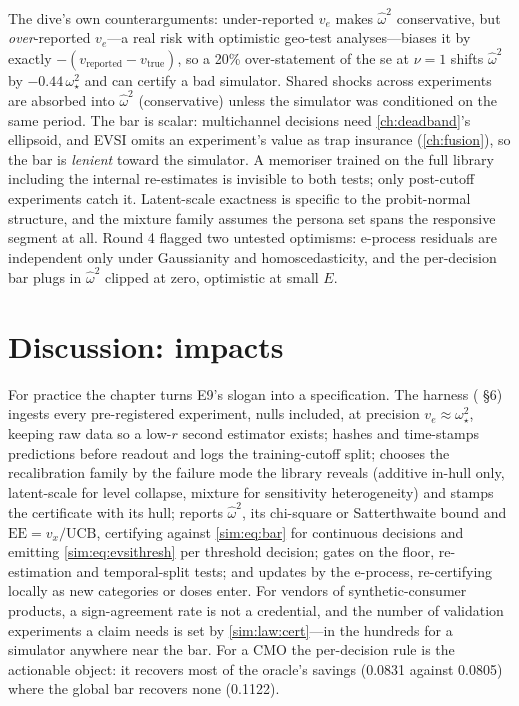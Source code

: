The dive's own counterarguments: under-reported $v_e$ makes $\hat\omega^2$ conservative, but \emph{over}-reported $v_e$---a real risk with optimistic geo-test analyses---biases it by exactly $-(v_{\mathrm{reported}} - v_{\mathrm{true}})$, so a 20\% over-statement of the se at $\nu = 1$ shifts $\hat\omega^2$ by $-0.44\,\omega_\star^2$ and can certify a bad simulator. Shared shocks across experiments are absorbed into $\hat\omega^2$ (conservative) unless the simulator was conditioned on the same period. The bar is scalar: multichannel decisions need \cref{ch:deadband}'s ellipsoid, and EVSI omits an experiment's value as trap insurance (\cref{ch:fusion}), so the bar is \emph{lenient} toward the simulator. A memoriser trained on the full library including the internal re-estimates is invisible to both tests; only post-cutoff experiments catch it. Latent-scale exactness is specific to the probit-normal structure, and the mixture family assumes the persona set spans the responsive segment at all. Round 4 flagged two untested optimisms: e-process residuals are independent only under Gaussianity and homoscedasticity, and the per-decision bar plugs in $\hat\omega^2$ clipped at zero, optimistic at small $E$.

\section{Discussion: impacts}
\label{sim:sec:discussion}

For practice the chapter turns E9's slogan into a specification. The harness ( \S6) ingests every pre-registered experiment, nulls included, at precision $v_e \approx \omega_\star^2$, keeping raw data so a low-$r$ second estimator exists; hashes and time-stamps predictions before readout and logs the training-cutoff split; chooses the recalibration family by the failure mode the library reveals (additive in-hull only, latent-scale for level collapse, mixture for sensitivity heterogeneity) and stamps the certificate with its hull; reports $\hat\omega^2$, its chi-square or Satterthwaite bound and $\mathrm{EE} = v_x/\mathrm{UCB}$, certifying against \cref{sim:eq:bar} for continuous decisions and emitting \cref{sim:eq:evsithresh} per threshold decision; gates on the floor, re-estimation and temporal-split tests; and updates by the e-process, re-certifying locally as new categories or doses enter. For vendors of synthetic-consumer products, a sign-agreement rate is not a credential, and the number of validation experiments a claim needs is set by \cref{sim:law:cert}---in the hundreds for a simulator anywhere near the bar. For a CMO the per-decision rule is the actionable object: it recovers most of the oracle's savings (0.0831 against 0.0805) where the global bar recovers none (0.1122).

